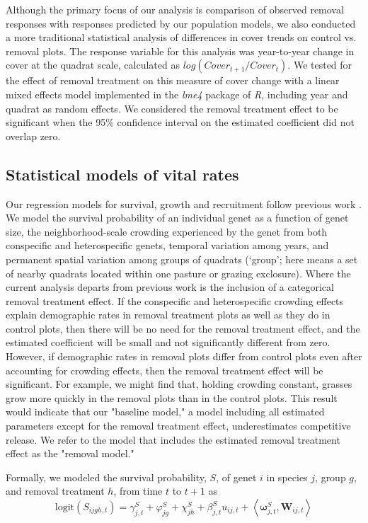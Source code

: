 \documentclass[11pt]{article}
\begin{document}
\begin{doublespacing}
Although the primary focus of our analysis is comparison of observed removal responses with responses predicted by our population models, we also conducted a more traditional statistical analysis of differences in cover trends on control vs. removal plots. The response variable for this analysis was year-to-year change in cover at the quadrat scale, calculated as $log(Cover_{t+1}/Cover_t)$. We tested for the effect of removal treatment on this measure of cover change with a linear mixed effects model implemented in the \textit{lme4} package \citep{Bates2015} of \textit{R}, including year and quadrat as random effects. We considered the removal treatment effect to be significant when the 95\% confidence interval on the estimated coefficient did not overlap zero.

\subsection*{Statistical models of vital rates}

Our regression models for survival, growth and recruitment follow previous work \citep{adler_coexistence_2010,chu_large_2015}. We model the survival probability of an individual genet as a function of genet size, the neighborhood-scale crowding experienced by the genet from both conspecific and heterospecific genets, temporal variation among years, and permanent spatial variation among groups of quadrats (`group'; here means a set of nearby quadrats located within one pasture or grazing exclosure). Where the current analysis departs from previous work is the inclusion of a categorical removal treatment effect. If the conspecific and heterospecific crowding effects explain demographic rates in removal treatment plots as well as they do in control plots, then there will be no need for the removal treatment effect, and the estimated coefficient will be small and not significantly different from zero. However, if demographic rates in removal plots differ from control plots even after accounting for crowding effects, then the removal treatment effect will be significant. For example, we might find that, holding crowding constant, grasses grow more quickly in the removal plots than in the control plots. This result would indicate that our "baseline model," a model including all estimated parameters except for the removal treatment effect, underestimates competitive release. We refer to the model that includes the estimated removal treatment effect as the "removal model."

Formally, we modeled the survival probability, $S$, of genet $i$ in species $j$, group $g$, and removal treatment $h$, from time $t$ to $t+1$  as
\begin{equation}
\mbox{logit}(S_{ijgh,t}) = \gamma_{j,t}^S + \varphi_{jg}^S+  \chi_{jh}^S  + \beta_{j,t}^S u_{ij,t} +  
\left \langle \boldsymbol{\omega}_{j,t}^S, \boldsymbol{W}_{ij,t} \right \rangle 
\label{eqn:survReg}
\end{equation}


\end{doublespacing}
\end{document}
